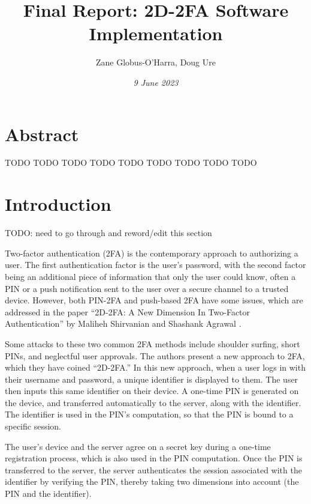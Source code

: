 \documentclass[11pt]{article} %
\title{Final Report: 2D-2FA Software Implementation}
\author{Zane Globus-O'Harra, Doug Ure}
\date{\textit{9 June 2023}}
\begin{document}
\maketitle

\section*{Abstract}

TODO TODO TODO TODO TODO TODO TODO TODO TODO 

\tableofcontents

\section{Introduction}

TODO: need to go through and reword/edit this section

Two-factor authentication (2FA) is the contemporary approach to
authorizing a user. The first authentication factor is the user's
password, with the second factor being an additional piece of
information that only the user could know, often a PIN or a push
notification sent to the user over a secure channel to a trusted device.
However, both PIN-2FA and push-based 2FA have some issues, which are
addressed in the paper ``2D-2FA: A New Dimension In Two-Factor
Authentication'' by Maliheh Shirvanian and Shashank Agrawal
\cite{shirvanian2d2fa}.

Some attacks to these two common 2FA methods include shoulder surfing,
short PINs, and neglectful user approvals. The authors present a new
approach to 2FA, which they have coined ``2D-2FA.'' In this new
approach, when a user logs in with their username and password, a
unique identifier is displayed to them. The user then inputs
this same identifier on their device. A one-time PIN is generated on the
device, and transferred automatically to the server, along with the
identifier. The identifier is used in the PIN's computation, so that the
PIN is bound to a specific session. 

The user's device and the server agree on a secret key during a one-time
registration process, which is also used in the PIN computation. Once
the PIN is transferred to the server, the server authenticates the
session associated with the identifier by verifying the PIN, thereby
taking two dimensions into account (the PIN and the identifier).
\end{document}

